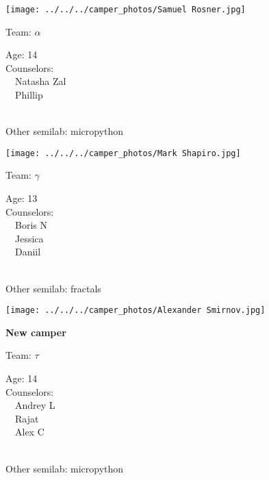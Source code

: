 \documentclass[10pt,letterpaper, landscape]{article}
\begin{document}
\horizontalshiftfornextsticker
\renewcommand{\baselinestretch}{1} \begin{sticker}
\noindent\begin{minipage}{0.5\textwidth}\texttt{[image: ../../../camper\_photos/Samuel Rosner.jpg]}\end{minipage}\begin{minipage}{0.45\textwidth}
Team: {\Large $\alpha$}

Age:        14\\
Counselors: \\\ \ Natasha Zal\\\ \ Phillip\\
\end{minipage} \\ \vspace{0.07in}
Other semilab: micropython
\end{sticker}
\horizontalshiftfornextsticker
\renewcommand{\baselinestretch}{1} \begin{sticker}
\noindent\begin{minipage}{0.5\textwidth}\texttt{[image: ../../../camper\_photos/Mark Shapiro.jpg]}\end{minipage}\begin{minipage}{0.45\textwidth}
Team: {\Large $\gamma$}

Age:        13\\
Counselors: \\\ \ Boris N\\\ \ Jessica\\\ \ Daniil\\
\end{minipage} \\ \vspace{0.07in}
Other semilab: fractals
\end{sticker}
\horizontalshiftfornextsticker
\renewcommand{\baselinestretch}{1} \begin{sticker}
\noindent\begin{minipage}{0.5\textwidth}\texttt{[image: ../../../camper\_photos/Alexander Smirnov.jpg]}\end{minipage}\begin{minipage}{0.45\textwidth}
\textbf{New camper} 

Team: {\Large $\tau$}

Age:        14\\
Counselors: \\\ \ Andrey L\\\ \ Rajat\\\ \ Alex C\\
\end{minipage} \\ \vspace{0.07in}
Other semilab: micropython
\end{sticker}
\end{document}
